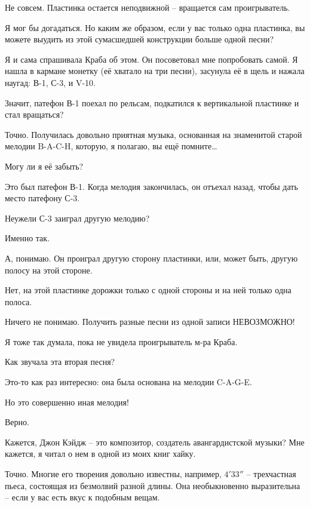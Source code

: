 \documentclass[../main.tex]{subfiles}
\begin{document}
\begin{dialogue}
 Не совсем. Пластинка остается неподвижной \--- вращается сам проигрыватель.

 Я мог бы догадаться. Но каким же образом, если у вас только одна пластинка, вы можете выудить из этой сумасшедшей конструкции больше одной песни?

 Я и сама спрашивала Краба об этом. Он посоветовал мне попробовать самой. Я нашла в кармане монетку (её хватало на три песни), засунула её в щель и нажала наугад: \mbox{В-1}, \mbox{С-3}, и \mbox{V-10}.

 Значит, патефон В-1 поехал по рельсам, подкатился к вертикальной пластинке и стал вращаться?

 Точно. Получилась довольно приятная музыка, основанная на знаменитой старой мелодии \mbox{B-A-C-H}, которую, я полагаю, вы ещё помните\ldots{}

 Могу ли я её забыть?

 Это был патефон \mbox{В-1}. Когда мелодия закончилась, он отъехал назад, чтобы дать место патефону \mbox{С-3}.

 Неужели \mbox{С-3} заиграл другую мелодию?

 Именно так.

 А, понимаю. Он проиграл другую сторону пластинки, или, может быть, другую полосу на этой стороне.

 Нет, на этой пластинке дорожки только с одной стороны и на ней только одна полоса.

 Ничего не понимаю. Получить разные песни из одной записи НЕВОЗМОЖНО!

 Я тоже так думала, пока не увидела проигрыватель м-ра Краба.

 Как звучала эта вторая песня?

 Это-то как раз интересно: она была основана на мелодии \mbox{C-A-G-E}.

 Но это совершенно иная мелодия!

 Верно.

 Кажется, Джон Кэйдж \--- это композитор, создатель авангардистской музыки? Мне кажется, я читал о нем в одной из моих книг хайку.

 Точно. Многие его творения довольно известны, например, $4'33''$ \--- трехчастная пьеса, состоящая из безмолвий разной длины. Она необыкновенно выразительна \--- если у вас есть вкус к подобным вещам.


\end{dialogue}
\end{document}

